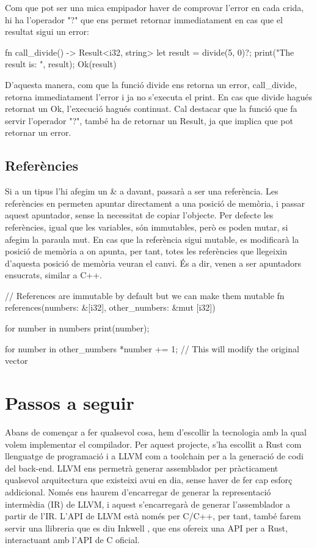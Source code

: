 ﻿\documentclass{article}
\begin{document}
Com que pot ser una mica empipador haver de comprovar l'error en cada crida, hi
ha l'operador "?" que ens permet retornar immediatament en cas que el resultat
sigui un error:

\begin{code}
fn call_divide() -> Result<i32, string> {
    let result = divide(5, 0)?;
    print("The result is: ", result);
    Ok(result)
}
\end{code}

D'aquesta manera, com que la funció divide ens retorna un error, call\_divide,
retorna immediatament l'error i ja no s'executa el print. En cas que divide hagués
retornat un Ok, l'execució hagués continuat. Cal destacar que la funció que 
fa servir l'operador "?", també ha de retornar un Result, ja que implica que pot
retornar un error.

\subsection{Referències}

Si a un tipus l'hi afegim un {\ttfamily \&} a davant, passarà a ser una referència. Les
referències en permeten apuntar directament a una posició de memòria, i passar
aquest apuntador, sense la necessitat de copiar l'objecte. Per defecte les
referències, igual que les variables, són immutables, però es poden mutar, si
afegim la paraula mut. En cas que la referència sigui mutable, es modificarà
la posició de memòria a on apunta, per tant, totes les referències que llegeixin
d'aquesta posició de memòria veuran el canvi. És a dir, venen a ser apuntadors
ensucrats, similar a C++.

\begin{code}
// References are immutable by default but we can make them mutable
fn references(numbers: &[i32], other_numbers: &mut [i32]) {
    for number in numbers {
        print(number);
    }

    for number in other_numbers {
        *number += 1; // This will modify the original vector
    }
}
\end{code}

\section{Passos a seguir}

Abans de començar a fer qualsevol cosa, hem d'escollir la tecnologia amb la qual
volem implementar el compilador. Per aquest projecte, s'ha escollit a Rust com
llenguatge de programació i a LLVM \cite{llvm_website} com a toolchain per a la generació de codi
del back-end. LLVM ens permetrà generar assemblador per pràcticament qualsevol
arquitectura que existeixi avui en dia, sense haver de fer cap esforç addicional.
Només ens haurem d'encarregar de generar la representació intermèdia (IR) de LLVM,
i aquest s'encarregarà de generar l'assemblador a partir de l'IR. L'API de LLVM 
està només per C/C++, per tant, també farem servir una llibreria que es diu 
Inkwell \cite{inkwell}, que ens ofereix una API per a Rust, interactuant amb 
l'API de C oficial.
\end{document}

